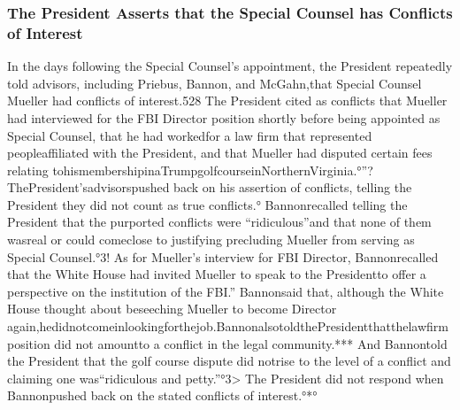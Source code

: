 {\subsubsection{The President Asserts that the Special Counsel has Conflicts of Interest}

In the days following the Special Counsel’s appointment, the President repeatedly told advisors, including Priebus, Bannon, and McGahn,that Special Counsel Mueller had conflicts of interest.528 The President cited as conflicts that Mueller had interviewed for the FBI Director position shortly before being appointed as Special Counsel, that he had workedfor a law firm that represented peopleaffiliated with the President, and that Mueller had disputed certain fees relating tohismembershipinaTrumpgolfcourseinNorthernVirginia.°”? ThePresident’sadvisorspushed back on his assertion of conflicts, telling the President they did not count as true conflicts.° Bannonrecalled telling the President that the purported conflicts were “ridiculous”and that none of them wasreal or could comeclose to justifying precluding Mueller from serving as Special Counsel.°3! As for Mueller’s interview for FBI Director, Bannonrecalled that the White House had invited Mueller to speak to the Presidentto offer a perspective on the institution of the FBI.” Bannonsaid that, although the White House thought about beseeching Mueller to become Director again,hedidnotcomeinlookingforthejob.BannonalsotoldthePresidentthatthelawfirm position did not amountto a conflict in the legal community.*** And Bannontold the President that the golf course dispute did notrise to the level of a conflict and claiming one was“ridiculous and petty.”°3> The President did not respond when Bannonpushed back on the stated conflicts of interest.°*°

}
